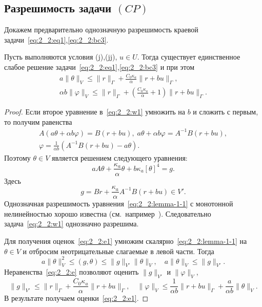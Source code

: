 \subsection{Разрешимость задачи $(CP)$}\label{subsec:ch2/sec2/subsec3}


Докажем предварительно однозначную разрешимость краевой задачи~\eqref{eq:2_2:eq1},\eqref{eq:2_2:bc3}.

\begin{lemma}
    \label{lm:2_2:1}
    Пусть выполняются условия (j),(jj), $u\in U$.
    Тогда существует единственное слабое решение
    задачи~\eqref{eq:2_2:eq1},\eqref{eq:2_2:bc3} и при этом
    \begin{equation}
        \label{eq:2_2:e1}
        \begin{aligned}
            a\|\theta\|_V \leq \|r\|_\Gamma + \frac{C_0\kappa_a}{\alpha}\|r+bu\|_\Gamma, \\
            \alpha b \|\varphi\|_V \leq \|r\|_\Gamma +
            \left(\frac{C_0\kappa_a}{\alpha} + 1\right)\|r+bu\|_\Gamma.
        \end{aligned}
    \end{equation}
\end{lemma}

\begin{proof}
    Если второе уравнение в~\eqref{eq:2_2:w1} умножить на $b$ и сложить с первым, то получим равенства
    \begin{gather*}
        A \left( a \theta + \alpha b \varphi \right) = B(r + bu),\;
        a\theta + \alpha b \varphi = A^{-1}B(r + bu),\\
        \varphi = \frac{1}{\alpha b}(A^{-1}B(r +bu) - a\theta).
    \end{gather*}
    Поэтому $\theta \in V$ является решением следующего уравнения:
    \begin{equation}
        \label{eq:2_2:lemma-1-1}
        a A \theta + \frac{\kappa_a}{\alpha} \theta + b\kappa_a [\theta]^4 = g.
    \end{equation}
    Здесь \[ g = Br + \frac{\kappa_a}{\alpha}A^{-1}B(r+bu) \in V'. \]
    Однозначная разрешимость уравнения~\eqref{eq:2_2:lemma-1-1} с монотонной нелинейностью
    хорошо известна (см.\ например~\cite{Kufner}).
    Следовательно задача~\eqref{eq:2_2:w1} однозначно разрешима.

    Для получения оценок~\eqref{eq:2_2:e1} умножим скалярно~\eqref{eq:2_2:lemma-1-1}
    на $\theta \in V$ и отбросим неотрицательные
    слагаемые в левой части.
    Тогда
    \[
        a \|\theta\|^2_V \leq (g, \theta) \leq \|g\|_{V'}\|\theta\|_V,
        \quad a\|\theta\|_V \leq \|g\|_{V'}.
    \]
    Неравенства~\eqref{eq:2_2:e} позволяют оценить $\|g\|_{V'}$ и $\|\varphi\|_V $,
    \[
        \|g\|_{V'} \leq \|r\|_\Gamma + \frac{C_0\kappa_a}{\alpha}\|r + bu\|_\Gamma, \quad
        \|\varphi\|_V \leq \frac{1}{\alpha b} \|r + bu\|_\Gamma + \frac{a}{\alpha b} \|\theta\|_V.
    \]
    В результате получаем оценки~\eqref{eq:2_2:e1}.
\end{proof}

